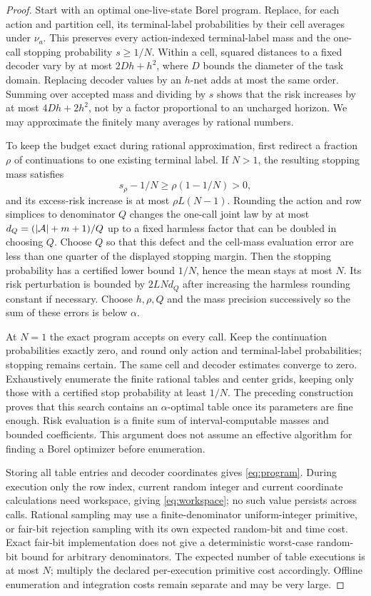 \begin{proof}
Start with an optimal one-live-state Borel program. Replace, for each action and partition cell, its terminal-label probabilities by their cell averages under $\nu_a$. This preserves every action-indexed terminal-label mass and the one-call stopping probability $s\ge1/N$. Within a cell, squared distances to a fixed decoder vary by at most $2Dh+h^2$, where $D$ bounds the diameter of the task domain. Replacing decoder values by an $h$-net adds at most the same order. Summing over accepted mass and dividing by $s$ shows that the risk increases by at most $4Dh+2h^2$, not by a factor proportional to an uncharged horizon. We may approximate the finitely many averages by rational numbers.

To keep the budget exact during rational approximation, first redirect a fraction $\rho$ of continuations to one existing terminal label. If $N>1$, the resulting stopping mass satisfies
\[
 s_\rho-1/N\ge\rho(1-1/N)>0,
\]
and its excess-risk increase is at most $\rho L(N-1)$. Rounding the action and row simplices to denominator $Q$ changes the one-call joint law by at most $d_Q=(|\mathcal A|+m+1)/Q$ up to a fixed harmless factor that can be doubled in choosing $Q$. Choose $Q$ so that this defect and the cell-mass evaluation error are less than one quarter of the displayed stopping margin. Then the stopping probability has a certified lower bound $1/N$, hence the mean stays at most $N$. Its risk perturbation is bounded by $2LN d_Q$ after increasing the harmless rounding constant if necessary. Choose $h,\rho,Q$ and the mass precision successively so the sum of these errors is below $\alpha$.

At $N=1$ the exact program accepts on every call. Keep the continuation probabilities exactly zero, and round only action and terminal-label probabilities; stopping remains certain. The same cell and decoder estimates converge to zero. Exhaustively enumerate the finite rational tables and center grids, keeping only those with a certified stop probability at least $1/N$. The preceding construction proves that this search contains an $\alpha$-optimal table once its parameters are fine enough. Risk evaluation is a finite sum of interval-computable masses and bounded coefficients. This argument does not assume an effective algorithm for finding a Borel optimizer before enumeration.

Storing all table entries and decoder coordinates gives \eqref{eq:program}. During execution only the row index, current random integer and current coordinate calculations need workspace, giving \eqref{eq:workspace}; no such value persists across calls. Rational sampling may use a finite-denominator uniform-integer primitive, or fair-bit rejection sampling with its own expected random-bit and time cost. Exact fair-bit implementation does not give a deterministic worst-case random-bit bound for arbitrary denominators. The expected number of table executions is at most $N$; multiply the declared per-execution primitive cost accordingly. Offline enumeration and integration costs remain separate and may be very large.
\end{proof}

